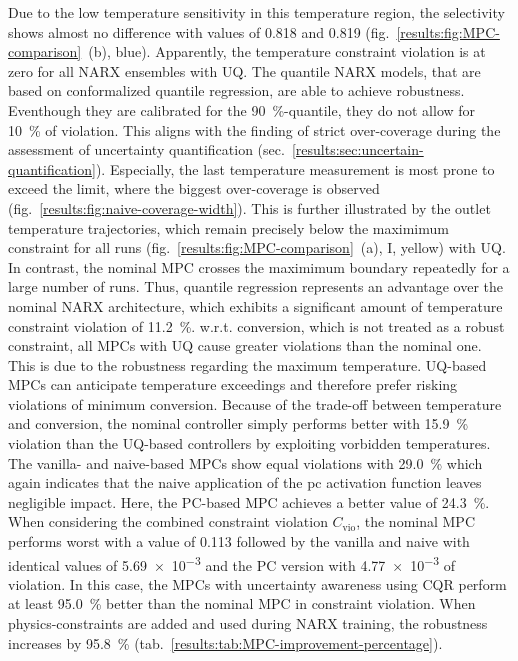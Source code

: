 \noindent
Due to the low temperature sensitivity in this temperature region, the selectivity shows almost
no difference with values of \SI{0.818}{} and \SI{0.819}{} (fig.~\ref{results:fig:MPC-comparison}~(b), blue). 
Apparently, the temperature constraint violation is at zero for all
NARX ensembles with UQ. The quantile NARX models, that are based
on conformalized quantile regression, are able to achieve robustness. 
Eventhough they are calibrated for the \SI{90}{\%}-quantile, they do not allow for \SI{10}{\%}
of violation. This aligns with the finding of strict over-coverage during 
the assessment of uncertainty quantification (sec.~\ref{results:sec:uncertain-quantification}).
Especially, the last temperature measurement is most prone to exceed the limit, where
the biggest over-coverage is observed (fig.~\ref{results:fig:naive-coverage-width}).
This is further illustrated by the outlet temperature trajectories, which 
remain precisely below the maximimum constraint for all runs 
(fig.~\ref{results:fig:MPC-comparison}~(a), I, yellow) with UQ. 
In contrast, the nominal MPC crosses the maximimum boundary repeatedly for a large number of runs.
Thus, quantile regression represents an advantage over the nominal NARX architecture, 
which exhibits a significant amount of temperature constraint violation of \SI{11.2}{\%}.
w.r.t. conversion, which is not treated as a robust constraint, all MPCs with UQ 
cause greater violations than the nominal one. This is due to the robustness regarding
the maximum temperature. UQ-based MPCs can anticipate temperature exceedings and
therefore prefer risking violations of minimum conversion.
Because of the trade-off between temperature and 
conversion, the nominal controller simply performs better with \SI{15.9}{\%} violation than the
UQ-based controllers by exploiting vorbidden temperatures. The vanilla- and naive-based 
MPCs show equal violations with \SI{29.0}{\%} which again indicates that the naive application of the 
pc activation function leaves negligible impact. Here, the PC-based MPC achieves a better
value of \SI{24.3}{\%}. When considering the combined constraint violation $C_\text{vio}$, 
the nominal MPC performs worst with a value of \SI{0.113}{} followed by the vanilla and naive
with identical values of \SI{5.69e-3}{} and the PC version with \SI{4.77e-3}{} of violation.
In this case, the MPCs with uncertainty awareness using CQR perform at least \SI{95.0}{\%} better than 
the nominal MPC in constraint violation. When physics-constraints are added and used during NARX
training, the robustness increases by \SI{95.8}{\%} (tab.~\ref{results:tab:MPC-improvement-percentage}).
\newline

